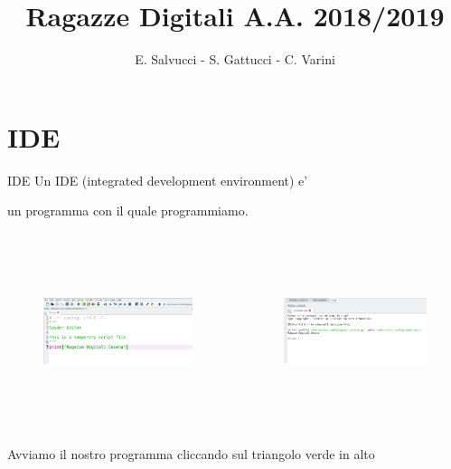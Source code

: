 \documentclass{beamer}
\title[Ragazze Digitali 2019]{Ragazze Digitali A.A. 2018/2019}
\author{E. Salvucci - S. Gattucci - C. Varini}
\date{}
\begin{document}



\section{IDE}

\begin{frame}{IDE}
Un IDE (integrated development environment) e'

un programma con il quale programmiamo.

	\begin{columns}
		\begin{column}{4cm}
			\begin{figure}
   				\includegraphics[height=5cm]{images/esempio_editor_spyder.png}
			\end{figure}
		\end{column}
		\begin{column}{6cm}
			\begin{figure}
   				\includegraphics[height=5cm]{images/esempio_console_spyder.png}
			\end{figure}
		\end{column}
	\end{columns}
Avviamo il nostro programma cliccando sul triangolo verde in alto	
\end{frame}






\end{document}
